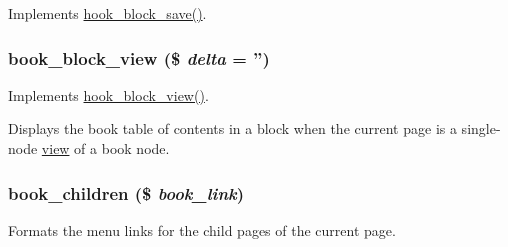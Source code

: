 \label{book_8module_a48769a6302a3aaa7d838c1c556827bf9}
Implements \hyperlink{group__hooks_ga622024ce4f818c241ca7a765e829f928}{hook\_\-block\_\-save()}. \hypertarget{book_8module_af0525aa2c7363bb58f08c2714da5d82f}{
\subsubsection[{book\_\-block\_\-view}]{\setlength{\rightskip}{0pt plus 5cm}book\_\-block\_\-view (\$ {\em delta} = {\ttfamily ''})}}
\label{book_8module_af0525aa2c7363bb58f08c2714da5d82f}
Implements \hyperlink{group__hooks_gaa14092a3e74cdc57aa295100cfd6860d}{hook\_\-block\_\-view()}.

Displays the book table of contents in a block when the current page is a single-\/node \hyperlink{classview}{view} of a book node. \hypertarget{book_8module_a46c88073da9468ea17c29b3615e75143}{
\subsubsection[{book\_\-children}]{\setlength{\rightskip}{0pt plus 5cm}book\_\-children (\$ {\em book\_\-link})}}
\label{book_8module_a46c88073da9468ea17c29b3615e75143}
Formats the menu links for the child pages of the current page.


